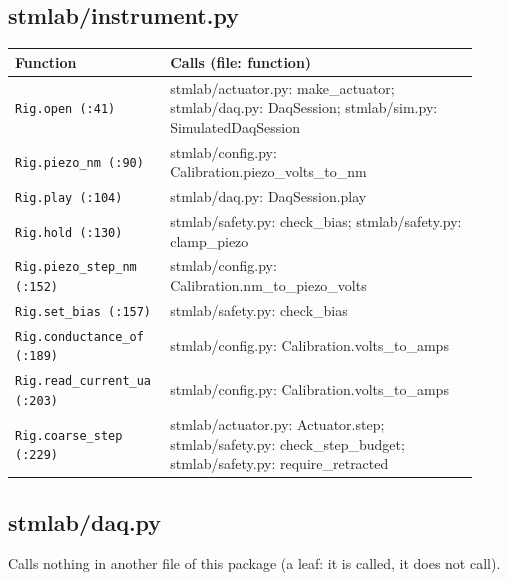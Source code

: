 \subsection{stmlab/instrument.py}

\small\setlength{\LTleft}{0pt}\setlength{\LTright}{\fill}
\begin{longtable}{@{}>{\raggedright\arraybackslash}p{0.280\linewidth}>{\raggedright\arraybackslash}p{0.640\linewidth}@{}}
\toprule
\textbf{Function} & \textbf{Calls (file: function)} \\
\midrule\endhead
\texttt{Rig.\discretionary{}{}{}open (:41)} & stmlab/actuator.py: make\_actuator; stmlab/daq.py: DaqSession; stmlab/sim.py: SimulatedDaqSession \\
\texttt{Rig.\discretionary{}{}{}piezo\_\discretionary{}{}{}nm (:90)} & stmlab/config.py: Calibration.piezo\_volts\_to\_nm \\
\texttt{Rig.\discretionary{}{}{}play (:104)} & stmlab/daq.py: DaqSession.play \\
\texttt{Rig.\discretionary{}{}{}hold (:130)} & stmlab/safety.py: check\_bias; stmlab/safety.py: clamp\_piezo \\
\texttt{Rig.\discretionary{}{}{}piezo\_\discretionary{}{}{}step\_\discretionary{}{}{}nm (:152)} & stmlab/config.py: Calibration.nm\_to\_piezo\_volts \\
\texttt{Rig.\discretionary{}{}{}set\_\discretionary{}{}{}bias (:157)} & stmlab/safety.py: check\_bias \\
\texttt{Rig.\discretionary{}{}{}conductance\_\discretionary{}{}{}of (:189)} & stmlab/config.py: Calibration.volts\_to\_amps \\
\texttt{Rig.\discretionary{}{}{}read\_\discretionary{}{}{}current\_\discretionary{}{}{}ua (:203)} & stmlab/config.py: Calibration.volts\_to\_amps \\
\texttt{Rig.\discretionary{}{}{}coarse\_\discretionary{}{}{}step (:229)} & stmlab/actuator.py: Actuator.step; stmlab/safety.py: check\_step\_budget; stmlab/safety.py: require\_retracted \\
\bottomrule
\end{longtable}
\normalsize

\subsection{stmlab/daq.py}

Calls nothing in another file of this package (a leaf: it is called, it does not call).

